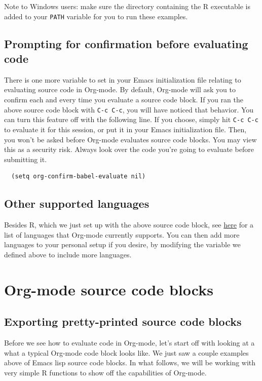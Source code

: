 \documentclass[11pt]{article}
\begin{document}
Note to Windows users: make sure the directory containing the R
executable is added to your \texttt{PATH} variable for you to run these
examples.

\subsection*{Prompting for confirmation before evaluating code}
\label{sec-2-1}

There is one more variable to set in your Emacs initialization file
relating to evaluating source code in Org-mode. By default, Org-mode
will ask you to confirm each and every time you evaluate a source code
block. If you ran the above source code block with \texttt{C-c C-c}, you will
have noticed that behavior. You can turn this feature off with the
following line. If you choose, simply hit \texttt{C-c C-c} to evaluate it for
this session, or put it in your Emacs initialization file. Then, you
won't be asked before Org-mode evaluates source code blocks. You may
view this as a security risk. Always look over the code you're going
to evaluate before submitting it.

\begin{verbatim}
  (setq org-confirm-babel-evaluate nil)
\end{verbatim}
\subsection*{Other supported languages}
\label{sec-2-2}

Besides R, which we just set up with the above source code block, see
\href{http://orgmode.org/manual/Languages.html#Languages}{here} for a list of languages that Org-mode currently supports. You can
then add more languages to your personal setup if you desire, by
modifying the variable we defined above to include more languages.
\section*{Org-mode source code blocks}
\label{sec-3}

\subsection*{Exporting pretty-printed source code blocks}
\label{sec-3-1}

Before we see how to evaluate code in Org-mode, let's start off with
looking at a what a typical Org-mode code block looks like. We just
saw a couple examples above of Emacs lisp source code blocks. In what
follows, we will be working with very simple R functions to show off
the capabilities of Org-mode.
\end{document}
